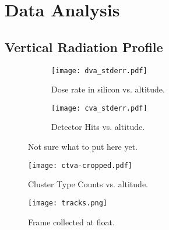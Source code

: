 \section{Data Analysis}
\label{Data Analysis}

\subsection{Vertical Radiation Profile}
\begin{figure}[H]
\centering
\begin{subfigure}{.5\textwidth}
  \centering
  \texttt{[image: dva\_stderr.pdf]}
  \caption{Dose rate in silicon vs. altitude.}
  \label{fig:sub1}
\end{subfigure}%
\begin{subfigure}{.5\textwidth}
  \centering
  \texttt{[image: cva\_stderr.pdf]}
  \caption{Detector Hits vs. altitude.}
  \label{fig:sub2}
\end{subfigure}
\caption{Not sure what to put here yet.}
\label{fig:test}
\end{figure}

\begin{figure}[H]
\centering
\texttt{[image: ctva-cropped.pdf]}
\caption{Cluster Type Counts vs. altitude.}
\end{figure}

\begin{figure}[H]
\centering
\texttt{[image: tracks.png]}
\caption{Frame collected at float.}
\end{figure}
